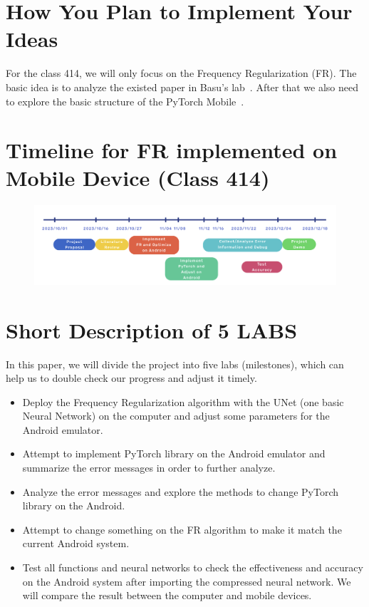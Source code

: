\documentclass{article}
\begin{document}
\section*{How You Plan to Implement Your Ideas}

For the class 414, we will only focus on the Frequency Regularization (FR). The basic idea is to analyze the existed paper in Basu's lab~\cite{zhao2023frequency}. After that we also need to explore the basic structure of the PyTorch Mobile~\cite{pytorch_mobile}.



\section*{Timeline for FR implemented on Mobile Device (Class 414)}
\begin{figure}[!h]
\centering
\includegraphics[width=1\textwidth]{./figure/timeline.png}
 \label{timeline_fig}
\end{figure}


\section*{Short Description of 5 LABS}

In this paper, we will divide the project into five labs (milestones), which can help us to double check our progress and adjust it timely.

\begin{itemize}
	\item Deploy the Frequency Regularization algorithm with the UNet (one basic Neural Network) on the computer and adjust some parameters for the Android emulator. 
	
	\item Attempt to implement PyTorch library on the Android emulator and summarize the error messages in order to further analyze.
	
	\item Analyze the error messages and explore the methods to change PyTorch library on the Android.
	
	\item Attempt to change something on the FR algorithm to make it match the current Android system. 
	
	\item Test all functions and neural networks to check the effectiveness and accuracy on the Android system after importing the compressed neural network. We will compare the result between the computer and mobile devices. 
	
\end{itemize}



\small

% 
  
\end{document}

